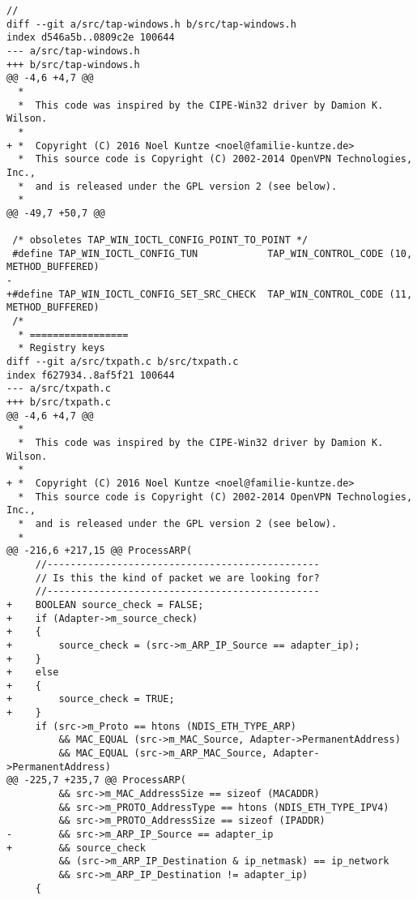 \begin{center}
\begin{lstlisting}[caption=Patch für TAP-Windows6]
         //
diff --git a/src/tap-windows.h b/src/tap-windows.h
index d546a5b..0809c2e 100644
--- a/src/tap-windows.h
+++ b/src/tap-windows.h
@@ -4,6 +4,7 @@
  *
  *  This code was inspired by the CIPE-Win32 driver by Damion K. Wilson.
  *
+ *  Copyright (C) 2016 Noel Kuntze <noel@familie-kuntze.de>
  *  This source code is Copyright (C) 2002-2014 OpenVPN Technologies, Inc.,
  *  and is released under the GPL version 2 (see below).
  *
@@ -49,7 +50,7 @@
 
 /* obsoletes TAP_WIN_IOCTL_CONFIG_POINT_TO_POINT */
 #define TAP_WIN_IOCTL_CONFIG_TUN            TAP_WIN_CONTROL_CODE (10, METHOD_BUFFERED)
-
+#define TAP_WIN_IOCTL_CONFIG_SET_SRC_CHECK  TAP_WIN_CONTROL_CODE (11, METHOD_BUFFERED)
 /*
  * =================
  * Registry keys
diff --git a/src/txpath.c b/src/txpath.c
index f627934..8af5f21 100644
--- a/src/txpath.c
+++ b/src/txpath.c
@@ -4,6 +4,7 @@
  *
  *  This code was inspired by the CIPE-Win32 driver by Damion K. Wilson.
  * 
+ *  Copyright (C) 2016 Noel Kuntze <noel@familie-kuntze.de>
  *  This source code is Copyright (C) 2002-2014 OpenVPN Technologies, Inc.,
  *  and is released under the GPL version 2 (see below).
  *
@@ -216,6 +217,15 @@ ProcessARP(
     //-----------------------------------------------
     // Is this the kind of packet we are looking for?
     //-----------------------------------------------
+    BOOLEAN source_check = FALSE;
+    if (Adapter->m_source_check)
+    {
+        source_check = (src->m_ARP_IP_Source == adapter_ip);
+    }
+    else
+    {
+        source_check = TRUE;
+    }
     if (src->m_Proto == htons (NDIS_ETH_TYPE_ARP)
         && MAC_EQUAL (src->m_MAC_Source, Adapter->PermanentAddress)
         && MAC_EQUAL (src->m_ARP_MAC_Source, Adapter->PermanentAddress)
@@ -225,7 +235,7 @@ ProcessARP(
         && src->m_MAC_AddressSize == sizeof (MACADDR)
         && src->m_PROTO_AddressType == htons (NDIS_ETH_TYPE_IPV4)
         && src->m_PROTO_AddressSize == sizeof (IPADDR)
-        && src->m_ARP_IP_Source == adapter_ip
+        && source_check
         && (src->m_ARP_IP_Destination & ip_netmask) == ip_network
         && src->m_ARP_IP_Destination != adapter_ip)
     {
\end{lstlisting}
\end{center}

